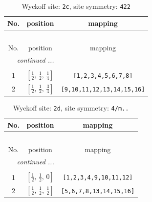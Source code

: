 \documentclass[fleqn,8pt]{jsarticle}
\begin{document}
\renewcommand{\arraystretch}{1.2}
\begin{longtable}{ccc}
\caption{Wyckoff site: {\tt 2c}, site symmetry: {\tt 422}}
 \\
 \hline \hline
No. & position & mapping \\ \hline \endfirsthead

\multicolumn{2}{l}{\tablename\ \thetable{}} \\
 \hline \hline
No. & position & mapping \\ \hline \endhead

 \hline \hline
\multicolumn{2}{r}{\footnotesize\it continued ...} \\ \endfoot

 \hline \hline
\multicolumn{2}{r}{} \\ \endlastfoot

1 & $\left[ \frac{1}{2},\, \frac{1}{2},\, \frac{1}{4} \right]$ & {\tt [1,2,3,4,5,6,7,8]} \\ \hline
2 & $\left[ \frac{1}{2},\, \frac{1}{2},\, \frac{3}{4} \right]$ & {\tt [9,10,11,12,13,14,15,16]} \\
\end{longtable}
\renewcommand{\arraystretch}{1.2}
\begin{longtable}{ccc}
\caption{Wyckoff site: {\tt 2d}, site symmetry: {\tt 4/m..}}
 \\
 \hline \hline
No. & position & mapping \\ \hline \endfirsthead

\multicolumn{2}{l}{\tablename\ \thetable{}} \\
 \hline \hline
No. & position & mapping \\ \hline \endhead

 \hline \hline
\multicolumn{2}{r}{\footnotesize\it continued ...} \\ \endfoot

 \hline \hline
\multicolumn{2}{r}{} \\ \endlastfoot

1 & $\left[ \frac{1}{2},\, \frac{1}{2},\, 0 \right]$ & {\tt [1,2,3,4,9,10,11,12]} \\ \hline
2 & $\left[ \frac{1}{2},\, \frac{1}{2},\, \frac{1}{2} \right]$ & {\tt [5,6,7,8,13,14,15,16]} \\
\end{longtable}
\renewcommand{\arraystretch}{1.2}
\end{document}
